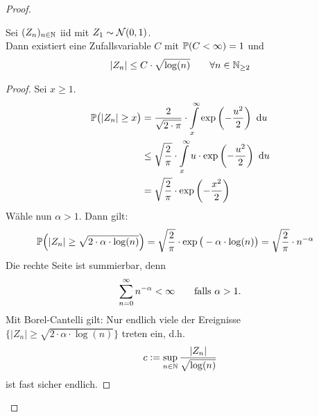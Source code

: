 \begin{proof}
	\begin{lemma}\label{lemma10.3}
		Sei $(Z_n)_{n\in\N}$ iid mit $Z_1\sim\Nor(0,1)$.\\
		Dann existiert eine Zufallsvariable $C$ mit $\P(C<\infty)=1$ und 
		\begin{align*}
			|Z_n|\leq C\cdot \sqrt{\log(n)}\qquad\forall n\in\N_{\geq2}
		\end{align*}
	\end{lemma}
	
	\begin{proof}
		Sei $x\geq 1$.
		\begin{align*}
			\P\big(|Z_n|\geq x\big)
			&=\frac{2}{\sqrt{2\cdot\pi}}\cdot\int\limits_x^\infty\exp\left(-\frac{u^2}{2}\right)\d u\\
			&\leq\sqrt{\frac{2}{\pi}}\cdot\int\limits_x^\infty u\cdot\exp\left(-\frac{u^2}{2}\right)\d u\\
			&=\sqrt{\frac{2}{\pi}}\cdot\exp\left(-\frac{x^2}{2}\right)
		\end{align*}
		Wähle nun $\alpha>1$. Dann gilt:
		\begin{align*}
			\P\Big(|Z_n|\geq\sqrt{2\cdot\alpha\cdot\log(n)}\Big)
			&=\sqrt{\frac{2}{\pi}}\cdot\exp\big(-\alpha\cdot\log(n)\big)
			=\sqrt{\frac{2}{\pi}}\cdot n^{-\alpha}
		\end{align*}
		Die rechte Seite ist summierbar, denn
		\begin{align*}
			\sum\limits_{n=0}^\infty n^{-\alpha}<\infty\qquad\falls\alpha >1.
		\end{align*}
		Mit Borel-Cantelli gilt:
		Nur endlich viele der Ereignisse $\big\lbrace|Z_n|\geq\sqrt{2\cdot\alpha\cdot\log(n)}\big\rbrace$ treten ein, d.h.
		\begin{align*}
			c:=\sup\limits_{n\in\N}\frac{|Z_n|}{\sqrt{\log(n)}}
		\end{align*}
		ist fast sicher endlich.
	\end{proof}
	

\end{proof}
